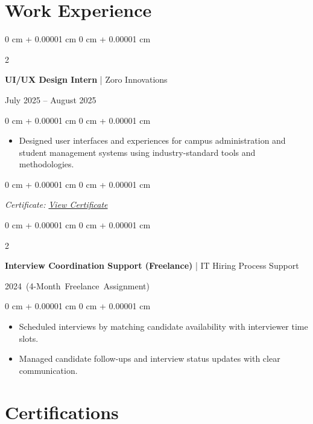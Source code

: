 \documentclass[10pt, a4paper]{article}
\newenvironment{highlights}{
    \begin{itemize}[
        topsep=0.06 cm,
        parsep=0.04 cm,
        partopsep=0pt,
        itemsep=0.02 cm,
        leftmargin=0 cm + 10pt
    ]
}{
    \end{itemize}
}
\newenvironment{onecolentry}{
    \begin{adjustwidth}{
        0 cm + 0.00001 cm
    }{
        0 cm + 0.00001 cm
    }
}{
    \end{adjustwidth}
}
\newenvironment{twocolentry}[2][4.5 cm]{
    \onecolentry
    \def\secondColumn{#2}
    \setcolumnwidth{\fill, #1}
    \begin{paracol}{2}
}{
    \switchcolumn \raggedleft \secondColumn
    \end{paracol}
    \endonecolentry
}
\begin{document}
    \section{Work Experience}

    \begin{twocolentry}{
        July 2025 – August 2025
    }
        \textbf{UI/UX Design Intern} | Zoro Innovations
    \end{twocolentry}

    \vspace{0.10 cm}
    \begin{onecolentry}
        \begin{highlights}
            \item Designed user interfaces and experiences for campus administration and student management systems using industry-standard tools and methodologies.
        \end{highlights}
    \end{onecolentry}

    \vspace{0.10 cm}
    \begin{onecolentry}
        \small{\textit{Certificate: \href{https://drive.google.com/file/d/1Mdj6kdTXaku3_Z-Vh2tATbli0cOKpZ-h/view?usp=sharing}{View Certificate}}}
    \end{onecolentry}

    \vspace{0.10 cm}
    \begin{twocolentry}[6.2 cm]{
        \small{\mbox{2024 (4-Month Freelance Assignment)}}
    }
        \textbf{Interview Coordination Support (Freelance)} | IT Hiring Process Support
    \end{twocolentry}

    \vspace{0.10 cm}
    \begin{onecolentry}
        \begin{highlights}
            \item Scheduled interviews by matching candidate availability with interviewer time slots.
            \item Managed candidate follow-ups and interview status updates with clear communication.
        \end{highlights}
    \end{onecolentry}

    \section{Certifications}
\end{document}
